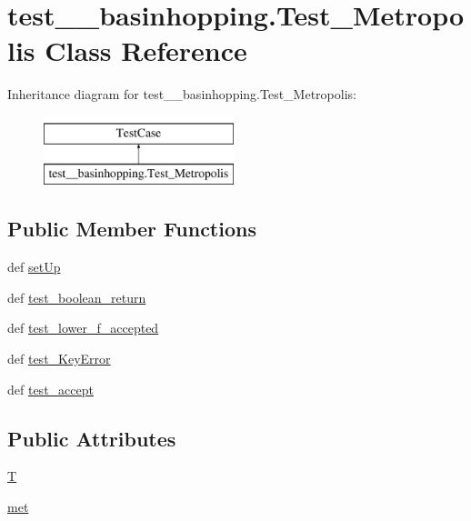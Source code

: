 \hypertarget{classtest____basinhopping_1_1Test__Metropolis}{}\section{test\+\_\+\+\_\+basinhopping.\+Test\+\_\+\+Metropolis Class Reference}
\label{classtest____basinhopping_1_1Test__Metropolis}
Inheritance diagram for test\+\_\+\+\_\+basinhopping.\+Test\+\_\+\+Metropolis\+:\begin{figure}[H]
\begin{center}
\leavevmode
\includegraphics[height=2.000000cm]{classtest____basinhopping_1_1Test__Metropolis}
\end{center}
\end{figure}
\subsection*{Public Member Functions}
\begin{DoxyCompactItemize}
\item 
def \hyperlink{classtest____basinhopping_1_1Test__Metropolis_a8c44e725172d2b4fcb01839f8688b126}{set\+Up}
\item 
def \hyperlink{classtest____basinhopping_1_1Test__Metropolis_aa2dbf125c8d28aa30c91e6d07e89343f}{test\+\_\+boolean\+\_\+return}
\item 
def \hyperlink{classtest____basinhopping_1_1Test__Metropolis_abdfae5dbad2561a5ef6484effffb8781}{test\+\_\+lower\+\_\+f\+\_\+accepted}
\item 
def \hyperlink{classtest____basinhopping_1_1Test__Metropolis_acd8b9da62cdb68ca4b458d3f763e9b16}{test\+\_\+\+Key\+Error}
\item 
def \hyperlink{classtest____basinhopping_1_1Test__Metropolis_ab9b6214eee88f82fc8be60164da41f8c}{test\+\_\+accept}
\end{DoxyCompactItemize}
\subsection*{Public Attributes}
\begin{DoxyCompactItemize}
\item 
\hyperlink{classtest____basinhopping_1_1Test__Metropolis_aa78cc31f813ee05ff584deefbf51e2ba}{T}
\item 
\hyperlink{classtest____basinhopping_1_1Test__Metropolis_a102e62d6f2b838d348368a163d4f6ae0}{met}
\end{DoxyCompactItemize}


